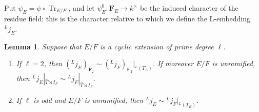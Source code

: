 \documentclass[reqno]{amsart}
\numberwithin{equation}{subsection}
\newcommand{\F}{\mathbf{F}}
\newcommand{\ol}[1]{\overline{#1}}
\newcommand{\wh}[1]{\widehat{#1}}
\newcommand{\co}{\colon}
\newcommand{\ld}{{}^L}
\DeclareMathOperator{\Tr}{Tr}
\newcommand{\bF}{\mathbf{F}}
\newtheorem{lemma}[thm]{Lemma}
\theoremstyle{remark}
\numberwithin{equation}{subsection}
\numberwithin{figure}{subsection}
\begin{document}
Put $\psi_E = \psi\circ\Tr_{E/F}$, and let $\psi_E^0\co \F_E\to k^\times$ be the induced character of the residue field; this is the character relative to which we define the L-embedding $\ld j_E$. %

\begin{lemma}\label{lemma:tasho-base-change}
Suppose that $E/F$ is a cyclic extension of prime degree $\ell$.
\begin{enumerate}
    \item If $\ell=2$, then $(\ld j_E)_{\ol\bF_2}\sim(\ld j_F)_{\ol\bF_2}|_{\ld(T_E)}$. If moreover $E/F$ is unramified, then $\ld j_E|_{\wh T \rtimes I_F}\sim\ld j_F|_{\wh T \rtimes I_F}$.
    \item If $\ell$ is odd and $E/F$ is unramified, then $\ld j_E\sim\ld j_F|_{\ld(T_E)}$.
\end{enumerate}
\end{lemma}
\end{document}
